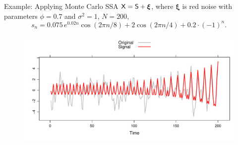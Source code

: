 \documentclass[notheorems, handout]{beamer}
\begin{document}
\begin{frame}{Example: Applying Monte Carlo SSA}
	$\mathsf{X}=\mathsf{S}+\boldsymbol{\xi}$, where $\boldsymbol{\xi}$ is red noise with parameters $\phi=0.7$ and $\sigma^2=1$, $N=200$,
	$$
		s_n=0.075\,e^{0.02n}\cos(2\pi n / 8) + 2\cos(2\pi n / 4) + 0.2\cdot (-1)^n.
	$$
	\begin{figure}
		\centering
		\includegraphics[width=\textwidth]{img/noise_ts_signal.pdf}
	\end{figure}
\end{frame}
\end{document}
